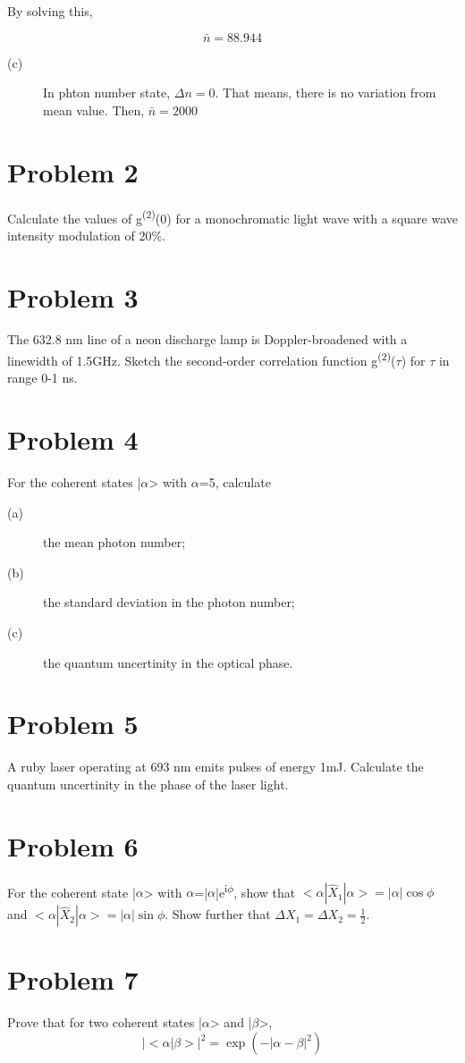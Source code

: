 \documentclass[a4paper,11pt]{article}
\begin{document}
By solving this,

$$\bar{n} =88.944$$

\begin{description}
\item[{(c)}] In phton number state, \(\Delta n=0\). That means, there is no variation from mean value. Then, \(\bar{n} = 2000\)
\end{description}





\section*{Problem 2}
\label{sec:org2deafe1}
Calculate the values of g\textsuperscript{(2)}(0) for a monochromatic light wave with a square wave intensity modulation of \textpm{} 20\%.

\section*{Problem 3}
\label{sec:org94a48c6}
The 632.8 nm line of a neon discharge lamp is Doppler-broadened with a linewidth of 1.5GHz. Sketch the second-order correlation function g\textsuperscript{(2)}(\(\tau\)) for \(\tau\) in range 0-1 ns.

\section*{Problem 4}
\label{sec:org4b51009}
For the coherent states |\(\alpha\)> with \(\alpha\)=5, calculate
\begin{description}
\item[{(a)}] the mean photon number;
\item[{(b)}] the standard deviation in the photon number;
\item[{(c)}] the quantum uncertinity in the optical phase.
\end{description}

\section*{Problem 5}
\label{sec:orgeefcfbe}
A ruby laser operating at 693 nm emits pulses of energy 1mJ. Calculate the quantum uncertinity in the phase of the laser light.

\section*{Problem 6}
\label{sec:org7fdba05}
For the coherent state |\(\alpha\)> with \(\alpha\)=|\(\alpha\)|e\textsuperscript{i\(\phi\)}, show that \(<\alpha|\hat{X}_1|\alpha>=|\alpha|\cos\phi\) and \(<\alpha|\hat{X}_2|\alpha>=|\alpha|\sin\phi\). Show further that \(\Delta X_1 = \Delta X_2 = \frac{1}{2}\).

\section*{Problem 7}
\label{sec:org3c4526a}
Prove that for two coherent states |\(\alpha\)> and |\(\beta\)>,
$$|<\alpha|\beta>|^2=\exp(-|\alpha-\beta|^2)$$
\end{document}
